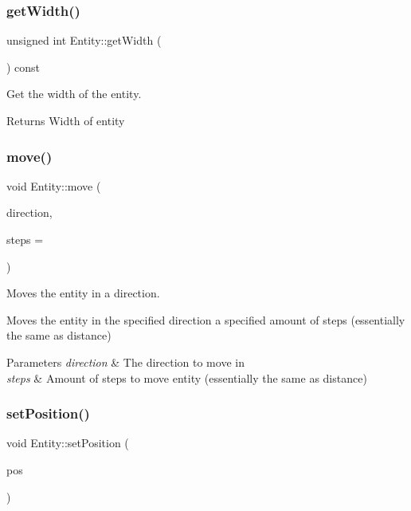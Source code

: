 \subsubsection{\texorpdfstring{get\+Width()}{getWidth()}}
{\footnotesize\ttfamily unsigned int Entity\+::get\+Width (\begin{DoxyParamCaption}{ }\end{DoxyParamCaption}) const}



Get the width of the entity. 

\begin{DoxyReturn}{Returns}
Width of entity 
\end{DoxyReturn}
\mbox{\label{classEntity_aba38705a06cf12c0e87b8b42713f3ce7}} 
\subsubsection{\texorpdfstring{move()}{move()}}
{\footnotesize\ttfamily void Entity\+::move (\begin{DoxyParamCaption}\item[{Direction}]{direction,  }\item[{unsigned int}]{steps = {} }\end{DoxyParamCaption})}



Moves the entity in a direction. 

Moves the entity in the specified direction a specified amount of steps (essentially the same as distance) 
\begin{DoxyParams}{Parameters}
{\em direction} & The direction to move in \\
\hline
{\em steps} & Amount of steps to move entity (essentially the same as distance) \\
\hline
\end{DoxyParams}
\mbox{\label{classEntity_abfef59d2e7f81727d43a86425e8e06df}} 
\subsubsection{\texorpdfstring{set\+Position()}{setPosition()}\hspace{0.1cm}{\footnotesize\ttfamily [1/2]}}
{\footnotesize\ttfamily void Entity\+::set\+Position (\begin{DoxyParamCaption}\item[{\hyperlink{structPoint}{Point}}]{pos }\end{DoxyParamCaption})}



